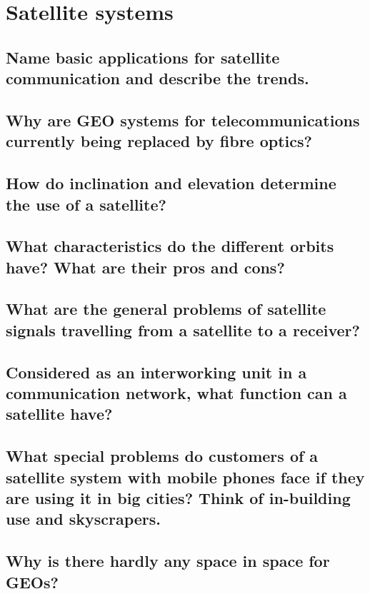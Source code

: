 \section{Satellite systems}

\subsection{Name basic applications for satellite communication and describe the trends.}

\subsection{Why are GEO systems for telecommunications currently being replaced by fibre
optics?}

\subsection{How do inclination and elevation determine the use of a satellite?}

\subsection{What characteristics do the different orbits have? What are their pros and cons?}

\subsection{What are the general problems of satellite signals travelling from a satellite to a
receiver?}

\subsection{Considered as an interworking unit in a communication network, what function can a
satellite have?}

\subsection{What special problems do customers of a satellite system with mobile phones face if
they are using it in big cities? Think of in-building use and skyscrapers.}

\subsection{Why is there hardly any space in space for GEOs?}




